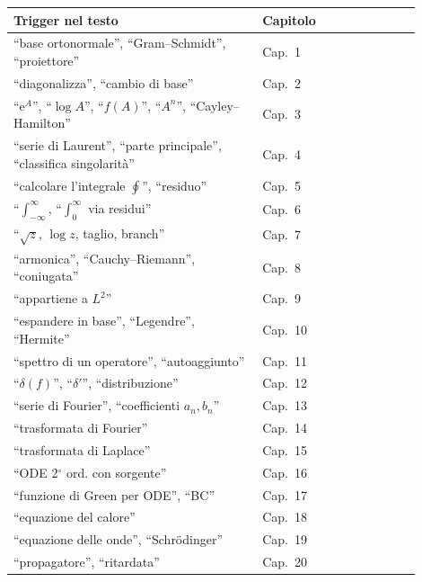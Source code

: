 \documentclass[11pt,a4paper,openany]{book}
\theoremstyle{definition}
\newcommand{\eu}{\mathrm{e}}
\begin{document}
\begin{center}
\begin{tabular}{p{0.55\linewidth}p{0.35\linewidth}}
\textbf{Trigger nel testo} & \textbf{Capitolo} \\\hline
``base ortonormale'', ``Gram--Schmidt'', ``proiettore'' & Cap.~1 \\
``diagonalizza'', ``cambio di base'' & Cap.~2 \\
``$\eu^A$'', ``$\log A$'', ``$f(A)$'', ``$A^n$'', ``Cayley--Hamilton'' & Cap.~3 \\
``serie di Laurent'', ``parte principale'', ``classifica singolarit\`a'' & Cap.~4 \\
``calcolare l'integrale $\oint$'', ``residuo'' & Cap.~5 \\
``$\int_{-\infty}^\infty$, ``$\int_0^\infty$ via residui'' & Cap.~6 \\
``$\sqrt z$, $\log z$, taglio, branch'' & Cap.~7 \\
``armonica'', ``Cauchy--Riemann'', ``coniugata'' & Cap.~8 \\
``appartiene a $L^2$'' & Cap.~9 \\
``espandere in base'', ``Legendre'', ``Hermite'' & Cap.~10 \\
``spettro di un operatore'', ``autoaggiunto'' & Cap.~11 \\
``$\delta(f)$'', ``$\delta'$'', ``distribuzione'' & Cap.~12 \\
``serie di Fourier'', ``coefficienti $a_n,b_n$'' & Cap.~13 \\
``trasformata di Fourier'' & Cap.~14 \\
``trasformata di Laplace'' & Cap.~15 \\
``ODE 2$^\circ$ ord. con sorgente'' & Cap.~16 \\
``funzione di Green per ODE'', ``BC'' & Cap.~17 \\
``equazione del calore'' & Cap.~18 \\
``equazione delle onde'', ``Schr\"odinger'' & Cap.~19 \\
``propagatore'', ``ritardata'' & Cap.~20 \\
\end{tabular}
\end{center}
\end{document}
